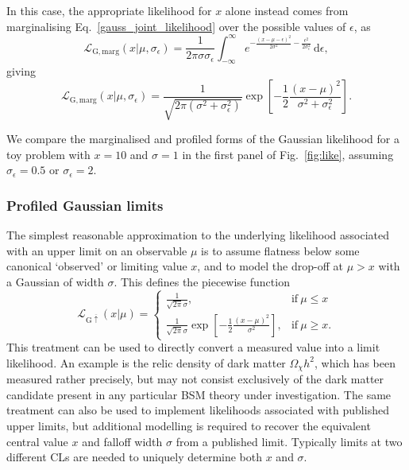 \documentclass[pdftex,twocolumn,epjc3_preprint,runningheads]{svjour3}
\renewcommand{\_}{\discretionary{\underscore}{}{\underscore}}
\begin{document}
In this case, the appropriate likelihood for $x$ alone instead comes from marginalising Eq.\ \ref{gauss_joint_likelihood} over the possible values of $\epsilon$, as
\begin{equation}
\mathcal{L}_\mathrm{G,marg}(x|\mu,\sigma_\epsilon) = \frac{1}{2\pi\sigma\sigma_\epsilon} \int^\infty_{-\infty} e^{-\frac{(x-\mu-\epsilon)^2}{2\sigma^2} - \frac{\epsilon^2}{2\sigma_\epsilon^2}}\,\mathrm{d}\epsilon,
\end{equation}
giving
\begin{equation}
\label{gauss_marg}
\mathcal{L}_\mathrm{G,marg}(x|\mu,\sigma_\epsilon) = \frac{1}{\sqrt{2\pi(\sigma^2 + \sigma_\epsilon^2)}} \exp\left[-\frac12\frac{(x-\mu)^2}{\sigma^2 + \sigma_\epsilon^2}\right].
\end{equation}

We compare the marginalised and profiled forms of the Gaussian likelihood for a toy problem with $x=10$ and $\sigma=1$ in the first panel of Fig.\ \ref{fig:like}, assuming $\sigma_\epsilon=0.5$ or $\sigma_\epsilon=2$.

\subsubsection{Profiled Gaussian limits}

The simplest reasonable approximation to the underlying likelihood associated with an upper limit on an observable $\mu$ is to assume flatness below some canonical `observed' or limiting value $x$, and to model the drop-off at $\mu>x$ with a Gaussian of width $\sigma$. This defines the piecewise function
\begin{equation}
\label{gauss_limit_simple}
\mathcal{L}_{\mathrm{G}\overline{\uparrow}}(x|\mu) = \begin{cases}
\frac{1}{\sqrt{2\pi}\sigma}, & \mathrm{if}\ \mu \le x\\
\frac{1}{\sqrt{2\pi}\sigma} \exp\left[-\frac12\frac{(x-\mu)^2}{\sigma^2}\right], & \mathrm{if}\ \mu \ge x.
\end{cases}
\end{equation}
This treatment can be used to directly convert a measured value into a limit likelihood.  An example is the relic density of dark matter $\Omega_\chi h^2$, which has been measured rather precisely, but may not consist exclusively of the dark matter candidate present in any particular BSM theory under investigation.  The same treatment can also be used to implement likelihoods associated with published upper limits, but additional modelling is required to recover the equivalent central value $x$ and falloff width $\sigma$ from a published limit. Typically limits at two different CLs are needed to uniquely determine both $x$ and $\sigma$.
\end{document}
